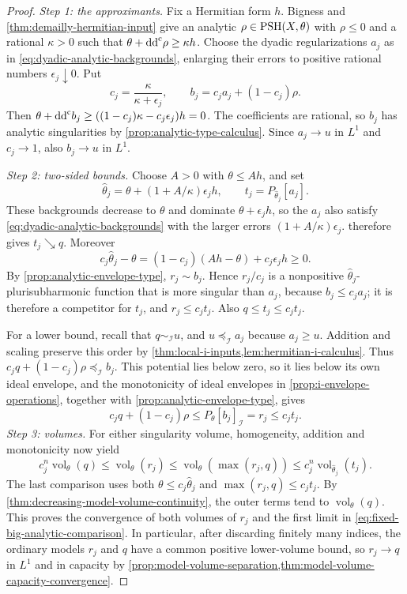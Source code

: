 \begin{proof}
\emph{Step 1: the approximants.} Fix a Hermitian form $h$. Bigness and \cref{thm:demailly-hermitian-input} give an analytic $\rho\in\mathrm{PSH}(X,\theta)$ with $\rho\leq0$ and a rational $\kappa>0$ such that $\theta+\mathrm{dd}^{\mathrm{c}}\rho\geq\kappa h$. Choose the dyadic regularizations $a_j$ as in \eqref{eq:dyadic-analytic-backgrounds}, enlarging their errors to positive rational numbers $\epsilon_j\downarrow0$. Put
\[
 c_j=\frac{\kappa}{\kappa+\epsilon_j},\qquad
 b_j=c_ja_j+(1-c_j)\rho.
\]
Then $\theta+\mathrm{dd}^{\mathrm{c}} b_j\geq((1-c_j)\kappa-c_j\epsilon_j)h=0$. The coefficients are rational, so $b_j$ has analytic singularities by \cref{prop:analytic-type-calculus}. Since $a_j\to u$ in $L^1$ and $c_j\to1$, also $b_j\to u$ in $L^1$.

\emph{Step 2: two-sided bounds.} Choose $A>0$ with $\theta\leq Ah$, and set
\[
 \widehat\theta_j=\theta+(1+A/\kappa)\epsilon_jh,
 \qquad t_j=P_{\widehat\theta_j}[a_j].
\]
These backgrounds decrease to $\theta$ and dominate $\theta+\epsilon_jh$, so the $a_j$ also satisfy \eqref{eq:dyadic-analytic-backgrounds} with the larger errors $(1+A/\kappa)\epsilon_j$.  therefore gives $t_j\searrow q$. Moreover
\[
 c_j\widehat\theta_j-\theta
  =(1-c_j)(Ah-\theta)+c_j\epsilon_jh\geq0.
\]
By \cref{prop:analytic-envelope-type}, $r_j\sim b_j$. Hence $r_j/c_j$ is a nonpositive $\widehat\theta_j$-plurisubharmonic function that is more singular than $a_j$, because $b_j\leq c_ja_j$; it is therefore a competitor for $t_j$, and $r_j\leq c_jt_j$. Also $q\leq t_j\leq c_jt_j$.

For a lower bound, recall that $q\sim_{\mathcal I}u$, and $u\preceq_{\mathcal I}a_j$ because $a_j\geq u$. Addition and scaling preserve this order by \cref{thm:local-i-inputs,lem:hermitian-i-calculus}. Thus $c_jq+(1-c_j)\rho\preceq_{\mathcal I}b_j$. This potential lies below zero, so it lies below its own ideal envelope, and the monotonicity of ideal envelopes in \cref{prop:i-envelope-operations}, together with \cref{prop:analytic-envelope-type}, gives
\[
 c_jq+(1-c_j)\rho\leq P_\theta[b_j]_{\mathcal I}=r_j
       \leq c_jt_j.
\]
\emph{Step 3: volumes.} For either singularity volume, homogeneity, addition and monotonicity now yield
\[
 c_j^n\operatorname{vol}_\theta(q)
 \leq\operatorname{vol}_\theta(r_j)
 \leq\operatorname{vol}_\theta(\max(r_j,q))
 \leq c_j^n\operatorname{vol}_{\widehat\theta_j}(t_j).
\]
The last comparison uses both $\theta\leq c_j\widehat\theta_j$ and $\max(r_j,q)\leq c_jt_j$. By \cref{thm:decreasing-model-volume-continuity}, the outer terms tend to $\operatorname{vol}_\theta(q)$. This proves the convergence of both volumes of $r_j$ and the first limit in \eqref{eq:fixed-big-analytic-comparison}. In particular, after discarding finitely many indices, the ordinary models $r_j$ and $q$ have a common positive lower-volume bound, so $r_j\to q$ in $L^1$ and in capacity by \cref{prop:model-volume-separation,thm:model-volume-capacity-convergence}.


\end{proof}
